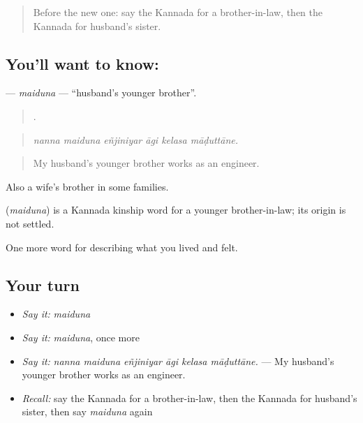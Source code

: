 \label{lesson:KA-C525-maiduna}



\begin{quote}
Before the new one: say the Kannada for a brother-in-law, then the Kannada for husband's sister.
\end{quote}

\subsection*{You'll want to know: }
\textbf{} — \emph{maiduna} — \textquotedblleft{}husband's younger brother\textquotedblright{}.

\begin{quote}
     .
\end{quote}

\begin{quote}
\emph{nanna maiduna eñjiniyar āgi kelasa māḍuttāne.}
\end{quote}

\begin{quote}
My husband's younger brother works as an engineer.
\end{quote}

Also a wife's brother in some families.

\begin{cousinweb}
\textbf{} (\emph{maiduna}) is a Kannada kinship word for a younger brother-in-law; its origin is not settled.
\end{cousinweb}

\begin{grammarlens}[title={What you've built}]
One more word for describing what you lived and felt.
\end{grammarlens}

\subsection*{Your turn}
\begin{itemize}
\raggedright
  \item \emph{Say it:} \emph{maiduna}
  \item \emph{Say it:} \emph{maiduna}, once more
  \item \emph{Say it:} \emph{nanna maiduna eñjiniyar āgi kelasa māḍuttāne.} — My husband's younger brother works as an engineer.
  \item \emph{Recall:} say the Kannada for a brother-in-law, then the Kannada for husband's sister, then say \emph{maiduna} again
\end{itemize}

